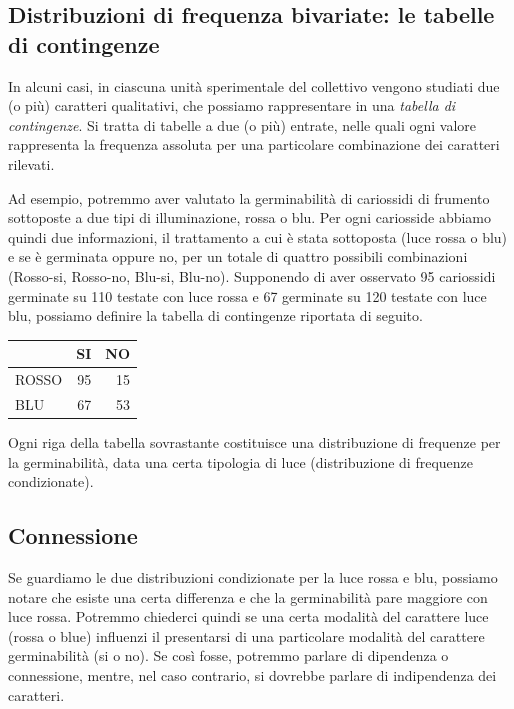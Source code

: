 \documentclass[a4paper,12pt,oneside]{book}
\begin{document}
\hypertarget{distribuzioni-di-frequenza-bivariate-le-tabelle-di-contingenze}{%
\subsection{Distribuzioni di frequenza bivariate: le tabelle di contingenze}\label{distribuzioni-di-frequenza-bivariate-le-tabelle-di-contingenze}}

In alcuni casi, in ciascuna unità sperimentale del collettivo vengono studiati due (o più) caratteri qualitativi, che possiamo rappresentare in una \emph{tabella di contingenze}. Si tratta di tabelle a due (o più) entrate, nelle quali ogni valore rappresenta la frequenza assoluta per una particolare combinazione dei caratteri rilevati.

Ad esempio, potremmo aver valutato la germinabilità di cariossidi di frumento sottoposte a due tipi di illuminazione, rossa o blu. Per ogni cariosside abbiamo quindi due informazioni, il trattamento a cui è stata sottoposta (luce rossa o blu) e se è germinata oppure no, per un totale di quattro possibili combinazioni (Rosso-si, Rosso-no, Blu-si, Blu-no). Supponendo di aver osservato 95 cariossidi germinate su 110 testate con luce rossa e 67 germinate su 120 testate con luce blu, possiamo definire la tabella di contingenze riportata di seguito.

\begin{tabular}{l|r|r}
\hline
  & SI & NO\\
\hline
ROSSO & 95 & 15\\
\hline
BLU & 67 & 53\\
\hline
\end{tabular}

Ogni riga della tabella sovrastante costituisce una distribuzione di frequenze per la germinabilità, data una certa tipologia di luce (distribuzione di frequenze condizionate).

\hypertarget{connessione}{%
\subsection{Connessione}\label{connessione}}

Se guardiamo le due distribuzioni condizionate per la luce rossa e blu, possiamo notare che esiste una certa differenza e che la germinabilità pare maggiore con luce rossa. Potremmo chiederci quindi se una certa modalità del carattere luce (rossa o blue) influenzi il presentarsi di una particolare modalità del carattere germinabilità (si o no). Se così fosse, potremmo parlare di dipendenza o connessione, mentre, nel caso contrario, si dovrebbe parlare di indipendenza dei caratteri.
\end{document}
